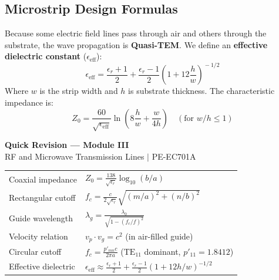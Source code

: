\documentclass[12pt,a4paper]{article}
\renewcommand{\arraystretch}{1.45}
\begin{document}
\subsection{Microstrip Design Formulas}
Because some electric field lines pass through air and others through the substrate, the wave propagation is \textbf{Quasi-TEM}. We define an \textbf{effective dielectric constant} ($\epsilon_{\text{eff}}$):
\begin{equation}
  \epsilon_{\text{eff}} = \frac{\epsilon_r + 1}{2} + \frac{\epsilon_r - 1}{2}\left(1 + 12\frac{h}{w}\right)^{\!-1/2}
\end{equation}
Where $w$ is the strip width and $h$ is substrate thickness. The characteristic impedance is:
\begin{equation}
  Z_0 = \frac{60}{\sqrt{\epsilon_{\text{eff}}}} \ln\left( 8\frac{h}{w} + \frac{w}{4h} \right) \quad \left(\text{for } w/h \le 1\right)
\end{equation}

\newpage
\begin{center}
  {\large\bfseries\color{myred} Quick Revision --- Module III}\\[3pt]
  {\small\color{mydark} RF and Microwave Transmission Lines $|$ PE-EC701A}
\end{center}
\noindent{\color{myred}\rule{\linewidth}{1.2pt}}
\vspace{4pt}

\begin{tcolorbox}[formulabox, title={\textbf{Key Formulas at a Glance}}]
\renewcommand{\arraystretch}{1.3}
\begin{tabularx}{\linewidth}{B{4.5cm} X}Coaxial impedance       & $Z_0 = \frac{138}{\sqrt{\epsilon_r}} \log_{10}(b/a)$ \\[4pt]
Rectangular cutoff      & $f_c = \frac{c}{2\sqrt{\epsilon_r}} \sqrt{(m/a)^2 + (n/b)^2}$ \\[4pt]
Guide wavelength        & $\lambda_g = \frac{\lambda_0}{\sqrt{1 - (f_c/f)^2}}$ \\[4pt]
Velocity relation       & $v_p \cdot v_g = c^2$ \quad (in air-filled guide) \\[4pt]
Circular cutoff         & $f_c = \frac{p'_{mn} c}{2\pi a}$ \quad ($\text{TE}_{11}$ dominant, $p'_{11}=1.8412$) \\[4pt]
Effective dielectric    & $\epsilon_{\text{eff}} \approx \frac{\epsilon_r + 1}{2} + \frac{\epsilon_r - 1}{2}(1 + 12h/w)^{-1/2}$
\end{tabularx}
\end{tcolorbox}
\end{document}
